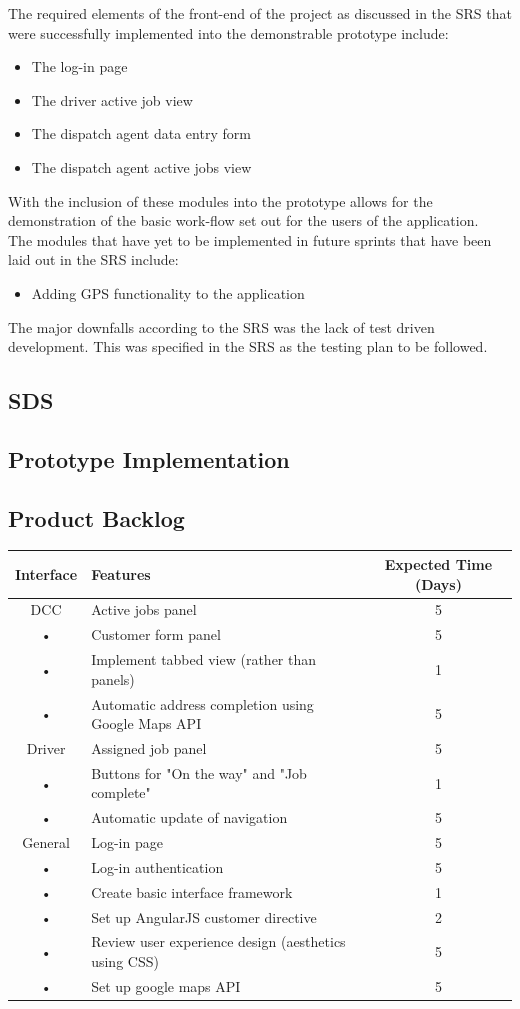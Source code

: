 \documentclass[12pt]{article}
\begin{document}
The required elements of the front-end of the project as discussed in the SRS that were successfully implemented into the demonstrable prototype include:
\begin{itemize}
\item The log-in page
\item The driver active job view
\item The dispatch agent data entry form
\item The dispatch agent active jobs view
\end{itemize}
With the inclusion of these modules into the prototype allows for the demonstration of the basic work-flow set out for the users of the application.\\

The modules that have yet to be implemented in future sprints that have been laid out in the SRS include:
\begin{itemize}
\item Adding GPS functionality to the application
\end{itemize}

The major downfalls according to the SRS was the lack of test driven development. This was specified in the SRS as the testing plan to be followed.
\subsection{SDS}
\subsection{Prototype Implementation}
\subsection{Product Backlog}
\begin{tabular}{|c|l|c|}
\hline 
Interface & Features & Expected Time (Days)\\ 
\hline 
DCC & Active jobs panel & 5\\ 
• & Customer form panel & 5\\ 
• & Implement tabbed view (rather than panels) & 1 \\
• & Automatic address completion using Google Maps API & 5\\

\hline 
Driver & Assigned job panel & 5\\
• & Buttons for "On the way" and "Job complete" & 1\\ 
• & Automatic update of navigation & 5\\
\hline 
General & Log-in page & 5\\ 
• & Log-in authentication & 5\\
• & Create basic interface framework & 1\\
• & Set up AngularJS customer directive & 2\\
• & Review user experience design (aesthetics using CSS) & 5\\
• & Set up google maps API & 5\\
\hline
\end{tabular} 
\end{document}
